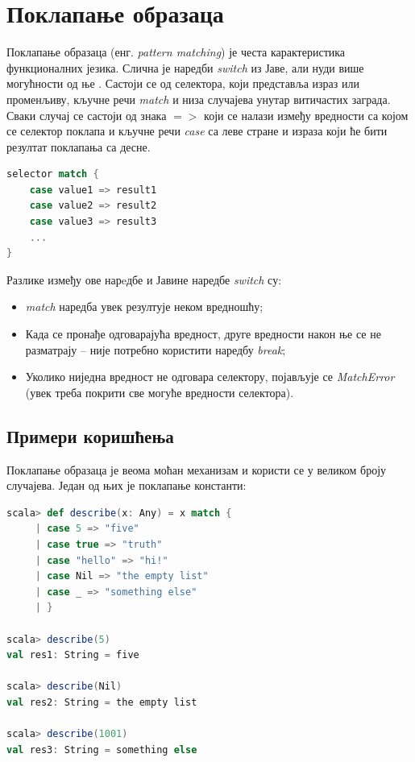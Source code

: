\documentclass[12pt,oneside]{memoir}
\begin{document}
\section{Поклапање образаца}
\label{sec:scala_patt_match}

Поклапање образаца (енг. \textit{pattern matching}) је честа карактеристика функционалних језика. Слична је наредби \textit{switch} из Јаве, али нуди више могућности од ње \cite{scala_prog}. Састоји се од селектора, који представља израз или променљиву, кључне речи \textit{match} и низа случајева унутар витичастих заграда. Сваки случај се састоји од знака $=>$ који се налази између вредности са којом се селектор поклапа и кључне речи \textit{case} са леве стране и израза који ће бити резултат поклапања са десне.

\begin{lstlisting}[language=Scala, caption={Поклапање образаца у Скали}, label={lst:scala_coll_patt_match}]
selector match {
	case value1 => result1
	case value2 => result2
	case value3 => result3
	...
}
\end{lstlisting}

Разлике између ове нарeдбе и Јавине наредбе \textit{switch} су:

\begin{itemize} 
\item \textit{match} наредба увек резултује неком вредношћу;
\item Када се пронађе одговарајућа вредност, друге вредности након ње се не разматрају -- није потребно користити наредбу \textit{break};
\item Уколико ниједна вредност не одговара селектору, појављује се \textit{MatchError} (увек треба покрити све могуће вредности селектора).
\end{itemize}

\subsection{Примери коришћења}
\label{subsec:scala_match_exaples}

Поклапање образаца је веома моћан механизам и користи се у великом броју случајева. Један од њих је поклапање константи:

\begin{lstlisting}[language=Scala, caption={Поклапање константи}, label={lst:scala_patt_match_match_const_example}]
scala> def describe(x: Any) = x match {
     | case 5 => "five"
     | case true => "truth"
     | case "hello" => "hi!"
     | case Nil => "the empty list"
     | case _ => "something else"
     | }
     
scala> describe(5)
val res1: String = five

scala> describe(Nil)
val res2: String = the empty list

scala> describe(1001)
val res3: String = something else
\end{lstlisting}
\end{document}
